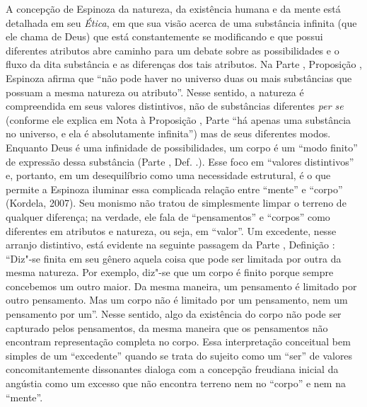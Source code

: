 A concepção de Espinoza da natureza, da existência humana e da mente
está detalhada em seu \emph{Ética}, em que sua visão acerca de uma
substância infinita (que ele chama de Deus) que está constantemente se
modificando e que possui diferentes atributos abre caminho para um
debate sobre as possibilidades e o fluxo da dita substância e as
diferenças dos tais atributos. Na Parte , Proposição , Espinoza afirma
que ``não pode haver no universo duas ou mais substâncias que possuam a
mesma natureza ou atributo''. Nesse sentido, a natureza é compreendida
em seus valores distintivos, não de substâncias diferentes \emph{per se}
(conforme ele explica em Nota à Proposição , Parte  ``há apenas uma
substância no universo, e ela é absolutamente infinita'') mas de seus
diferentes modos. Enquanto Deus é uma infinidade de possibilidades, um
corpo é um ``modo finito'' de expressão dessa substância (Parte , Def.
.). Esse foco em ``valores distintivos'' e, portanto, em um
desequilíbrio como uma necessidade estrutural, é o que permite a
Espinoza iluminar essa complicada relação entre ``mente'' e ``corpo''
(Kordela, 2007). Seu monismo não tratou de simplesmente limpar o terreno
de qualquer diferença; na verdade, ele fala de ``pensamentos'' e
``corpos'' como diferentes em atributos e natureza, ou seja, em
``valor''. Um excedente, nesse arranjo distintivo, está evidente na
seguinte passagem da Parte , Definição : ``Diz"-se finita em seu
gênero aquela coisa que pode ser limitada por outra da mesma natureza.
Por exemplo, diz"-se que um corpo é finito porque sempre concebemos um
outro maior. Da mesma maneira, um pensamento é limitado por outro
pensamento. Mas um corpo não é limitado por um pensamento, nem um
pensamento por um''. Nesse sentido, algo da existência do corpo não pode
ser capturado pelos pensamentos, da mesma maneira que os pensamentos não
encontram representação completa no corpo. Essa interpretação conceitual
bem simples de um ``excedente'' quando se trata do sujeito como um
``ser'' de valores concomitantemente dissonantes dialoga com a concepção
freudiana inicial da angústia como um excesso que não encontra terreno
nem no ``corpo'' e nem na ``mente''.

